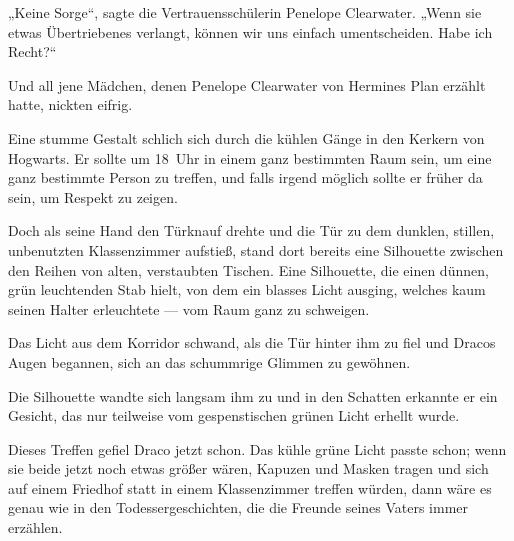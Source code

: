 „Keine Sorge“, sagte die Vertrauensschülerin Penelope Clearwater.
„Wenn sie etwas Übertriebenes verlangt, können wir uns einfach umentscheiden. Habe ich Recht?“

Und all jene Mädchen, denen Penelope Clearwater von Hermines Plan erzählt hatte, nickten eifrig.

\later

Eine stumme Gestalt schlich sich durch die kühlen Gänge in den Kerkern von Hogwarts. Er sollte um 18~Uhr in einem ganz bestimmten Raum sein, um eine ganz bestimmte Person zu treffen, und falls irgend möglich sollte er früher da sein, um Respekt zu zeigen.

Doch als seine Hand den Türknauf drehte und die Tür zu dem dunklen, stillen, unbenutzten Klassenzimmer aufstieß, stand dort bereits eine Silhouette zwischen den Reihen von alten, verstaubten Tischen. Eine Silhouette, die einen dünnen, grün leuchtenden Stab hielt, von dem ein blasses Licht ausging, welches kaum seinen Halter erleuchtete — vom Raum ganz zu schweigen.

Das Licht aus dem Korridor schwand, als die Tür hinter ihm zu fiel und Dracos Augen begannen, sich an das schummrige Glimmen zu gewöhnen.

Die Silhouette wandte sich langsam ihm zu und in den Schatten erkannte er ein Gesicht, das nur teilweise vom gespenstischen grünen Licht erhellt wurde.

Dieses Treffen gefiel Draco jetzt schon. Das kühle grüne Licht passte schon; wenn sie beide jetzt noch etwas größer wären, Kapuzen und Masken tragen und sich auf einem Friedhof statt in einem Klassenzimmer treffen würden, dann wäre es genau wie in den Todessergeschichten, die die Freunde seines Vaters immer erzählen.

